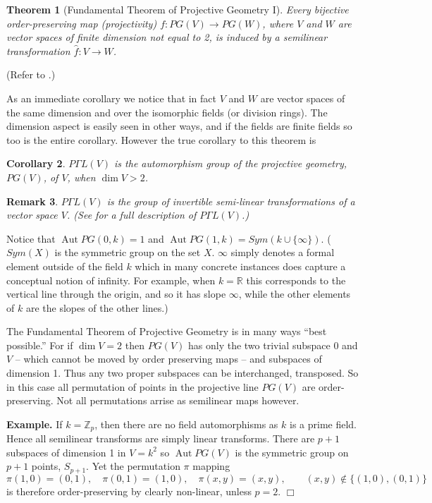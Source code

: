 \documentclass[12pt]{article}
\newtheorem{thm}{Theorem}
\newtheorem{coro}[thm]{Corollary}
\newtheorem{remark}[thm]{Remark}
\providecommand{\union}{\cup}
\DeclareMathOperator{\Aut}{Aut }
\begin{document}
\begin{thm}[Fundamental Theorem of Projective Geometry I]
Every bijective order-preserving map (projectivity) $f:PG(V)\rightarrow PG(W)$, where $V$ and $W$ are vector spaces of finite dimension not equal to 2, is induced by a semilinear transformation $\hat{f}:V\rightarrow W$.
\end{thm}
(Refer to \cite[Theorem 3.5.5,Theorem 3.5.6]{GW}.)

As an immediate corollary we notice that in fact $V$ and $W$ are vector spaces of the same dimension and over the isomorphic fields (or division rings).  The dimension aspect is easily seen in other ways, and if the fields are finite fields so too is the entire corollary.  However the true corollary to this theorem is

\begin{coro}
$P\Gamma L(V)$ is the automorphism group of the projective geometry, $PG(V)$, of $V$, when $\dim V>2$.
\end{coro}

\begin{remark}
$P\Gamma L(V)$ is the group of invertible semi-linear transformations of a
vector space $V$.
(See  for a full description of $P\Gamma L(V)$.)
\end{remark}

Notice that $\Aut PG(0,k)=1$ and $\Aut PG(1,k)=Sym(k\union\{\infty\})$.
($Sym(X)$ is the symmetric group on the set $X$.  $\infty$ simply denotes a
formal element outside of the field $k$ which in many concrete instances does
capture a conceptual notion of infinity.  For example, when $k=\mathbb{R}$ this corresponds to the vertical line through the origin, and so it has slope $\infty$, while the other elements of $k$ are the slopes of the other lines.)

The Fundamental Theorem of Projective Geometry is in many ways ``best possible.''  For if $\dim V=2$ then $PG(V)$ has only the two trivial subspace $0$ and $V$ -- which cannot be moved by order preserving maps -- and subspaces of dimension 1.  Thus any two proper subspaces can be interchanged, transposed.  So in this case all permutation of points in the projective line $PG(V)$ are order-preserving.  Not all permutations arrise as semilinear maps however.  

\textbf{Example.}
If $k=\mathbb{Z}_p$, then there are no field automorphisms as $k$ is a prime field.  Hence all semilinear transforms are simply linear transforms.  There are $p+1$ subspaces of dimension 1 in $V=k^2$ so $\Aut PG(V)$ is the symmetric group on $p+1$ points, $S_{p+1}$.  Yet the permutation $\pi$ mapping 
\[\pi(1,0)=(0,1),\quad \pi(0,1)=(1,0),\quad \pi(x,y)=(x,y), \qquad (x,y)\notin\{(1,0),(0,1)\}\]
is therefore order-preserving by clearly non-linear, unless $p=2$.
$\Box$
\end{document}
